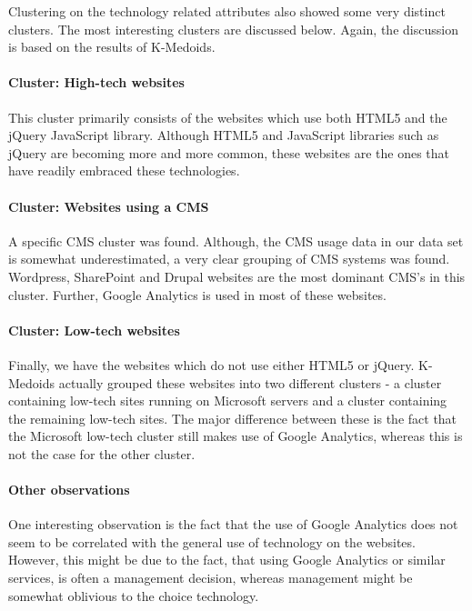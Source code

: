 Clustering on the technology related attributes also showed some very distinct clusters. The most interesting clusters are discussed below. Again, the discussion is based on the results of {K-Medoids}.

\paragraph{Cluster: High-tech websites}

This cluster primarily consists of the websites which use both {HTML5} and the {jQuery} JavaScript library. Although {HTML5} and JavaScript libraries such as {jQuery} are becoming more and more common, these websites are the ones that have readily embraced these technologies.

\paragraph{Cluster: Websites using a CMS}

A specific {CMS} cluster was found. Although, the {CMS} usage data in our data set is somewhat underestimated, a very clear grouping of {CMS} systems was found. {Wordpress}, {SharePoint} and {Drupal} websites are the most dominant {CMS}'s in this cluster. Further, {Google Analytics} is used in most of these websites.

\paragraph{Cluster: Low-tech websites}

Finally, we have the websites which do not use either {HTML5} or {jQuery}. {K-Medoids} actually grouped these websites into two different clusters - a cluster containing low-tech sites running on {Microsoft} servers and a cluster containing the remaining low-tech sites. The major difference between these is the fact that the {Microsoft} low-tech cluster still makes use of {Google Analytics}, whereas this is not the case for the other cluster.

\paragraph{Other observations}

One interesting observation is the fact that the use of {Google Analytics} does not seem to be correlated with the general use of technology on the websites. However, this might be due to the fact, that using {Google Analytics} or similar services, is often a management decision, whereas management might be somewhat oblivious to the choice technology.


